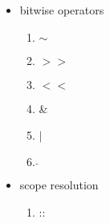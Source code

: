 \documentclass{article}
\begin{document}
\begin{itemize}
        \item{bitwise operators}
        \begin{enumerate}
          \item{$ \sim $}
          \item{$ >> $}
          \item{$ << $}
          \item{\&}
          \item{ $ | $}
          \item{$ \hat{} $}
        \end{enumerate}

        \item{scope resolution}
        \begin{enumerate}
          \item{::}
        \end{enumerate}
      \end{itemize}
\end{document}
